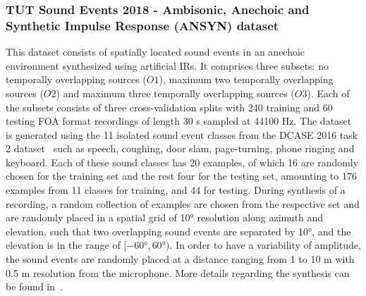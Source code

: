 \documentclass[journal]{IEEEtran}
\begin{document}
\subsubsection{TUT Sound Events 2018 - Ambisonic, Anechoic and Synthetic Impulse Response (ANSYN) dataset} This dataset consists of spatially located sound events in an anechoic environment synthesized using artificial IRs. It comprises three subsets: no temporally overlapping sources ($O1$), maximum two temporally overlapping sources ($O2$) and maximum three temporally overlapping sources ($O3$). Each of the subsets consists of three cross-validation splits with 240 training and 60 testing FOA format recordings of length 30 s sampled at 44100 Hz. The dataset is generated using the 11 isolated sound event classes from the DCASE 2016 task 2 dataset~\cite{dcase2016Task2} such as speech,
coughing, door slam, page-turning, phone ringing and keyboard. Each of these sound classes has 20 examples, of which 16 are randomly chosen for the training set and the rest four for the testing set, amounting to 176 examples from 11 classes for training, and 44 for testing. During synthesis of a recording, a random collection of examples are chosen from the respective set and are randomly placed in a spatial grid of \ang{10} resolution along azimuth and elevation, such that two overlapping sound events are separated by \ang{10}, and the elevation is in the range of $[\ang{-60}, \ang{60})$. In order to have a variability of amplitude, the sound events are randomly placed at a distance ranging from 1 to 10 m with 0.5 m resolution from the microphone. More details regarding the synthesis can be found in~\cite{Adavanne2018_EUSIPCO}.
\end{document}

